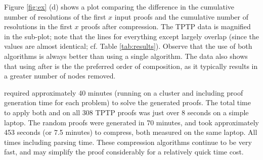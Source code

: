 {Figure \ref{fig:ex} (d) shows a plot comparing the difference in the cumulative number of resolutions of the first $x$ input proofs and the cumulative number of resolutions in the first $x$ proofs after compression. The TPTP data is magnified in the sub-plot; note that the lines for everything except {\FORPI} largely overlap (since the values are almost identical; cf. Table \ref{tab:results}). Observe that the use of both algorithms is always better than using a single algorithm. The data also shows that using {\FORPI} after {\GFOLU} is the the preferred order of composition, as it typically results in a greater number of nodes removed.



{\SPASS} required approximately 40 minutes (running on a cluster and including proof generation time for each problem) to solve the generated proofs. The total time to apply both {\FORPI} and {\GFOLU} on all 308 TPTP proofs was just over 8 seconds on a simple laptop. The random proofs were generated in 70 minutes, and took approximately 453 seconds (or 7.5 minutes) to compress, both measured on the same laptop.
All times including parsing time. These compression algorithms continue to be very fast, and may simplify the proof considerably for a relatively quick time cost.







}
